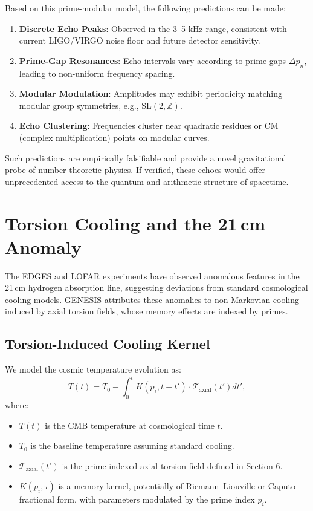 \documentclass{article}
\theoremstyle{plain}
\begin{document}
Based on this prime-modular model, the following predictions can be made:
\begin{enumerate}
    \item \textbf{Discrete Echo Peaks}: Observed in the 3–5 kHz range, consistent with current LIGO/VIRGO noise floor and future detector sensitivity.
    \item \textbf{Prime-Gap Resonances}: Echo intervals vary according to prime gaps $\Delta p_n$, leading to non-uniform frequency spacing.
    \item \textbf{Modular Modulation}: Amplitudes may exhibit periodicity matching modular group symmetries, e.g., $\text{SL}(2,\mathbb{Z})$.
    \item \textbf{Echo Clustering}: Frequencies cluster near quadratic residues or CM (complex multiplication) points on modular curves.
\end{enumerate}

Such predictions are empirically falsifiable and provide a novel gravitational probe of number-theoretic physics. If verified, these echoes would offer unprecedented access to the quantum and arithmetic structure of spacetime.

\section{Torsion Cooling and the 21 cm Anomaly}

The EDGES and LOFAR experiments have observed anomalous features in the 21 cm hydrogen absorption line, suggesting deviations from standard cosmological cooling models. GENESIS attributes these anomalies to non-Markovian cooling induced by axial torsion fields, whose memory effects are indexed by primes.

\subsection{Torsion-Induced Cooling Kernel}

We model the cosmic temperature evolution as:
\[
T(t) = T_0 - \int_0^t K(p_i, t - t') \cdot \mathcal{T}_{\text{axial}}(t') dt',
\]
where:
\begin{itemize}
    \item $T(t)$ is the CMB temperature at cosmological time $t$.
    \item $T_0$ is the baseline temperature assuming standard cooling.
    \item $\mathcal{T}_{\text{axial}}(t')$ is the prime-indexed axial torsion field defined in Section 6.
    \item $K(p_i, \tau)$ is a memory kernel, potentially of Riemann–Liouville or Caputo fractional form, with parameters modulated by the prime index $p_i$.
\end{itemize}
\end{document}

